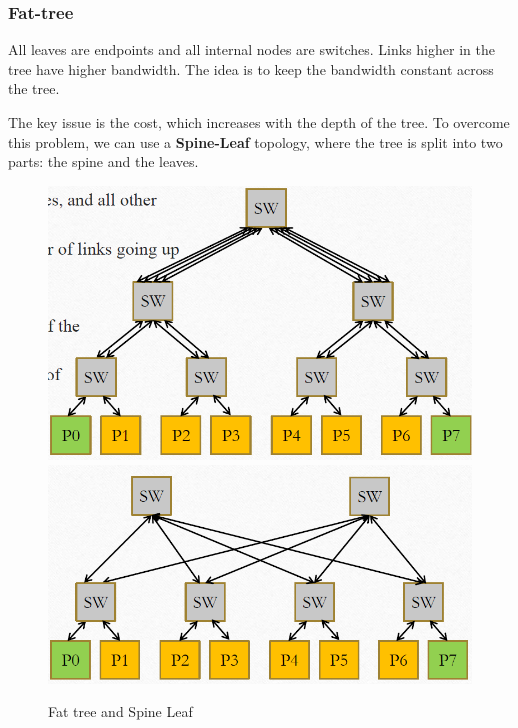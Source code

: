 \subsubsection{Fat-tree}
\begin{paracol}{2}
   
   All leaves are endpoints and all internal nodes are switches.
   Links higher in the tree have higher bandwidth.
   The idea is to keep the bandwidth constant across the tree.

   The key issue is the cost, which increases with the depth of the tree.
   To overcome this problem, we can use a \textbf{Spine-Leaf} topology, where the tree is split into two parts: the spine and the leaves.

   \switchcolumn
   \begin{figure}[htbp]
      \centering
      \includegraphics{images/05/fat_tree.png}
      \includegraphics{images/05/fat_tree2.png}
      \caption{Fat tree and Spine Leaf}
      \label{fig:05/fat_tree}
   \end{figure}
   
\end{paracol}

